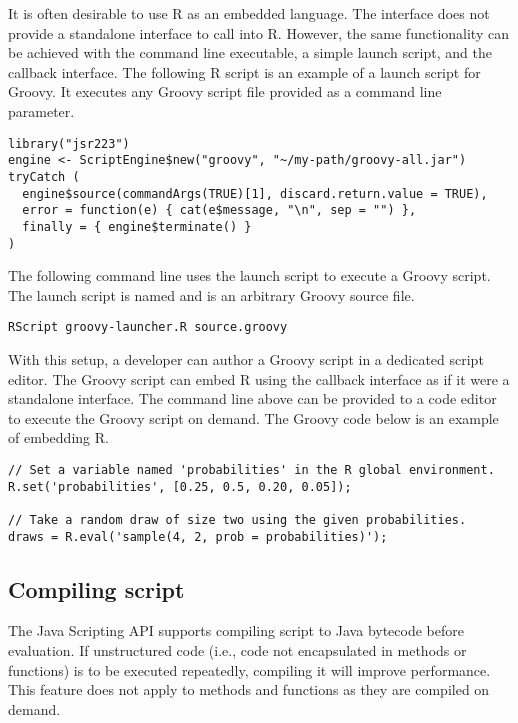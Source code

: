 It is often desirable to use R as an embedded language. The  interface does not provide a standalone interface to call into R. However, the same functionality can be achieved with the  command line executable, a simple launch script, and the  callback interface. The following R script is an example of a launch script for Groovy. It executes any Groovy script file provided as a command line parameter.

\begin{verbatim}
library("jsr223")
engine <- ScriptEngine$new("groovy", "~/my-path/groovy-all.jar")
tryCatch (
  engine$source(commandArgs(TRUE)[1], discard.return.value = TRUE),
  error = function(e) { cat(e$message, "\n", sep = "") },
  finally = { engine$terminate() }
)
\end{verbatim}

The following command line uses the launch script to execute a Groovy script. The launch script is named  and  is an arbitrary Groovy source file.

\begin{verbatim}
RScript groovy-launcher.R source.groovy
\end{verbatim}

With this setup, a developer can author a Groovy script in a dedicated script editor. The Groovy script can embed R using the  callback interface as if it were a standalone interface. The command line above can be provided to a code editor to execute the Groovy script on demand. The Groovy code below is an example of embedding R.

\begin{verbatim}
// Set a variable named 'probabilities' in the R global environment.
R.set('probabilities', [0.25, 0.5, 0.20, 0.05]);

// Take a random draw of size two using the given probabilities.
draws = R.eval('sample(4, 2, prob = probabilities)');
\end{verbatim}

\subsection{Compiling script}

The Java Scripting API supports compiling script to Java bytecode before evaluation. If unstructured code (i.e., code not encapsulated in methods or functions) is to be executed repeatedly, compiling it will improve performance. This feature does not apply to methods and functions as they are compiled on demand.

